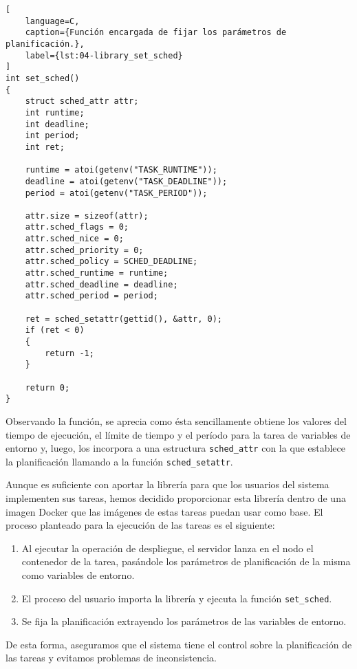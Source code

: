 \begin{lstlisting}[
    language=C,
    caption={Función encargada de fijar los parámetros de planificación.},
    label={lst:04-library_set_sched}
]
int set_sched()
{
    struct sched_attr attr;
    int runtime;
    int deadline;
    int period;
    int ret;

    runtime = atoi(getenv("TASK_RUNTIME"));
    deadline = atoi(getenv("TASK_DEADLINE"));
    period = atoi(getenv("TASK_PERIOD"));

    attr.size = sizeof(attr);
    attr.sched_flags = 0;
    attr.sched_nice = 0;
    attr.sched_priority = 0;
    attr.sched_policy = SCHED_DEADLINE;
    attr.sched_runtime = runtime;
    attr.sched_deadline = deadline;
    attr.sched_period = period;

    ret = sched_setattr(gettid(), &attr, 0);
    if (ret < 0)
    {
        return -1;
    }

    return 0;
}
\end{lstlisting}

Observando la función, se aprecia como ésta sencillamente obtiene los valores
del tiempo de ejecución, el límite de tiempo y el período para la tarea de
variables de entorno y, luego, los incorpora a una estructura
\texttt{sched\_attr} con la que establece la planificación llamando a la función
\texttt{sched\_setattr}.

Aunque es suficiente con aportar la librería para que los usuarios del sistema
implementen sus tareas, hemos decidido proporcionar esta librería dentro de una
imagen Docker que las imágenes de estas tareas puedan usar como base. El proceso
planteado para la ejecución de las tareas es el siguiente:

\begin{enumerate}
    \item Al ejecutar la operación de despliegue, el servidor lanza en el nodo
          el contenedor de la tarea, pasándole los parámetros de planificación de la
          misma como variables de entorno.
    \item El proceso del usuario importa la librería y ejecuta la función
          \texttt{set\_sched}.
    \item Se fija la planificación extrayendo los parámetros de las variables de
          entorno.
\end{enumerate}

De esta forma, aseguramos que el sistema tiene el control sobre la planificación
de las tareas y evitamos problemas de inconsistencia.

